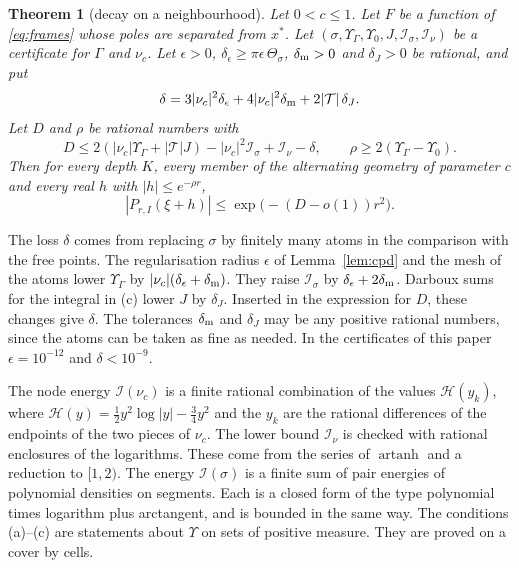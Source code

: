 \documentclass[11pt]{amsart}
\newtheorem{theorem}{Theorem}[section]
\theoremstyle{definition}
\theoremstyle{remark}
\numberwithin{equation}{section}
\newcommand{\cI}{\mathcal I}
\begin{document}
\begin{theorem}[decay on a neighbourhood]\label{thm:decay}
Let $0<c\le1$. Let $F$ be a function of \eqref{eq:frames} whose poles are separated from $x^*$. Let
$(\sigma,\Upsilon_\Gamma,\Upsilon_0,J,\cI_\sigma,\cI_\nu)$ be a certificate for $\Gamma$ and $\nu_c$. Let $\epsilon>0$,
$\delta_\epsilon\ge\pi\epsilon\,\Theta_\sigma$, $\delta_{\rm m}>0$ and $\delta_J>0$ be rational, and put
\[
 \delta=3|\nu_c|^2\delta_\epsilon+4|\nu_c|^2\delta_{\rm m}+2|\mathcal T|\,\delta_J .
\]
Let $D$ and $\rho$ be rational numbers with
\[
 D\le2(|\nu_c|\Upsilon_\Gamma+|\mathcal T|J)-|\nu_c|^2\cI_\sigma+\cI_\nu-\delta,\qquad
 \rho\ge2(\Upsilon_\Gamma-\Upsilon_0).
\]
Then for every depth $K$, every member of the alternating geometry of parameter $c$ and every real $h$ with
$|h|\le e^{-\rho r}$,
\[
 |P_{r,I}(\xi+h)|\le\exp\bigl(-(D-o(1))r^2\bigr).
\]
\end{theorem}

The loss $\delta$ comes from replacing $\sigma$ by finitely many atoms in the comparison with the free points. The
regularisation radius $\epsilon$ of Lemma~\ref{lem:cpd} and the mesh of the atoms lower $\Upsilon_\Gamma$ by
$|\nu_c|(\delta_\epsilon+\delta_{\rm m})$. They raise $\cI_\sigma$ by $\delta_\epsilon+2\delta_{\rm m}$. Darboux sums for the
integral in (c) lower $J$ by $\delta_J$. Inserted in the expression for $D$, these changes give $\delta$. The tolerances
$\delta_{\rm m}$ and $\delta_J$ may be any positive rational numbers, since the atoms can be taken as fine as needed. In
the certificates of this paper $\epsilon=10^{-12}$ and $\delta<10^{-9}$.

The node energy $\cI(\nu_c)$ is a finite rational combination of the values $\mathcal H(y_k)$, where
$\mathcal H(y)=\frac12y^2\log|y|-\frac34y^2$ and the $y_k$ are the rational differences of the endpoints of the two pieces
of $\nu_c$. The lower bound $\cI_\nu$ is checked with rational enclosures of the logarithms. These come from the series of
$\operatorname{artanh}$ and a reduction to $[1,2)$. The energy $\cI(\sigma)$ is a finite sum of pair energies of
polynomial densities on segments. Each is a closed form of the type polynomial times logarithm plus arctangent, and is
bounded in the same way. The conditions (a)--(c) are statements about $\Upsilon$ on sets of positive measure. They are
proved on a cover by cells.
\end{document}
